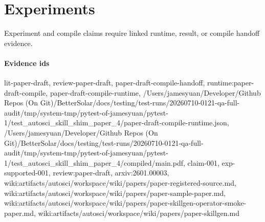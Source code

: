 \section{Experiments}
Experiment and compile claims require linked runtime, result, or compile handoff evidence.

\paragraph{Evidence ids} lit-paper-draft, review-paper-draft, paper-draft-compile-handoff, runtime:paper-draft-compile, paper-draft-compile-runtime, /Users/jamesyuan/Developer/Github Repos (On Git)/BetterSolar/docs/testing/test-runs/20260710-0121-qa-full-audit/tmp/system-tmp/pytest-of-jamesyuan/pytest-1/test\_autosci\_skill\_shim\_paper\_4/paper-draft-compile-runtime.json, /Users/jamesyuan/Developer/Github Repos (On Git)/BetterSolar/docs/testing/test-runs/20260710-0121-qa-full-audit/tmp/system-tmp/pytest-of-jamesyuan/pytest-1/test\_autosci\_skill\_shim\_paper\_4/compiled/main.pdf, claim-001, exp-supported-001, review:paper-draft, arxiv:2601.00003, wiki:artifacts/autosci/workspace/wiki/papers/paper-registered-source.md, wiki:artifacts/autosci/workspace/wiki/papers/paper-sample-paper.md, wiki:artifacts/autosci/workspace/wiki/papers/paper-skillgen-operator-smoke-paper.md, wiki:artifacts/autosci/workspace/wiki/papers/paper-skillgen.md
